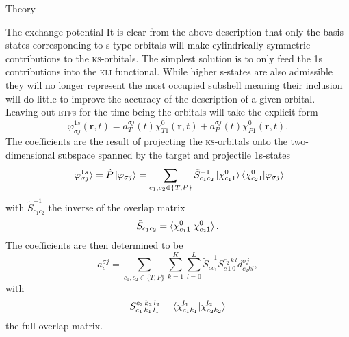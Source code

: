 \documentclass[aps, pra, reprint, groupedaddress, amsfonts, longbibliography,
               amsmath, amssymb, showpacs, nofootinbib]{revtex4-1}
\begin{document}
\begin{section}{Theory \label{sec:theory}}
\begin{subsection}{The exchange potential \label{sec:xpot}}
      It is clear from the above description that only the basis states corresponding to s-type orbitals
      will make cylindrically symmetric contributions to the \textsc{ks}-orbitals. The simplest solution
      is to only feed the 1s contributions into the \textsc{kli} functional. While higher s-states are
      also admissible they will no longer represent the most occupied subshell meaning their inclusion
      will do little to improve the accuracy of the description of a given orbital. Leaving out
      \textsc{etf}s for the time being the orbitals will take the explicit form
      \begin{equation} \label{eq:1sonly}
         \varphi_{\sigma j}^{1s}(\mathbf{r},t) = a^{\sigma j}_T(t) \chi^{0}_{T1}(\mathbf{r},t)
                                               + a^{\sigma j}_P(t) \chi^{0}_{P1}(\mathbf{r},t).
      \end{equation}
      The coefficients are the result of projecting the \textsc{ks}-orbitals onto the two-dimensional
      subspace spanned by the target and projectile 1s-states
      \begin{equation} \label{eq:proj}
         \ket{\varphi^{1s}_{\sigma j}} = \hat{P} \ket{\varphi_{\sigma j}}
                                       = \sum\limits_{c_1, c_2 \in \{T,P\}} \tilde{S}^{-1}_{c_1 c_2}
                                                      \ket{\chi^{0}_{c_1 1}}
                                                      \braket{\chi^{0}_{c_2 1}| \varphi_{\sigma j}}
      \end{equation}
      with $\tilde{S}^{-1}_{c_1 c_2}$ the inverse of the overlap matrix
      \begin{equation} \label{eq:overlap2d}
         \tilde{S}_{c_1 c_2} = \braket{ \chi^{0}_{c_1 1} | \chi^{0}_{c_2 1} }.
      \end{equation}
      The coefficients are then determined to be
      \begin{equation} \label{eq:coef}
         a^{\sigma j}_c = \sum\limits_{c_1, c_2 \in \{T,P\}} \sum\limits_{k = 1}^K
                          \sum\limits_{l = 0}^L \tilde{S}^{-1}_{c c_1} S^{c_2 \, k \, l}_{c \, 1 \, 0}
                             d^{\sigma j}_{c_2 k l},
      \end{equation}
      with
      \begin{equation} \label{eq:overlap}
         S_{c_1 \, k_1 \, l_1 }^{c_2 \, k_2 \, l_2 } =
            \braket{ \chi^{l_1}_{c_1 k_1} | \chi^{l_2}_{c_2 k_2} }
      \end{equation}
      the full overlap matrix.


\end{subsection}
\end{section}
\end{document}
